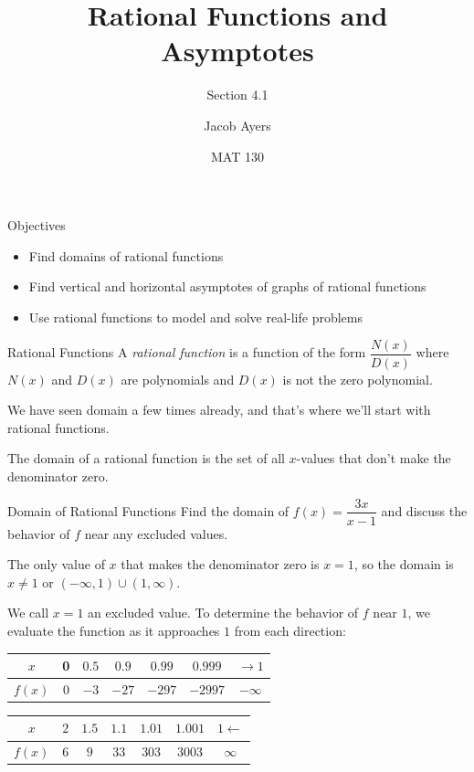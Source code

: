 \documentclass[t]{beamer}
\title[4.1]{Rational Functions and Asymptotes}
\subtitle{Section 4.1}
\author{Jacob Ayers}
\institute{Lesson \#15}
\date{MAT 130}
\begin{document}
	
	\begin{frame}
		\titlepage
	\end{frame}
	
	\begin{frame}{Objectives}
		\begin{itemize}
			\item Find domains of rational functions
			\item Find vertical and horizontal asymptotes of graphs of rational functions
			\item Use rational functions to model and solve real-life problems
		\end{itemize}
	\end{frame}

	\begin{frame}{Rational Functions}
		A \textit{rational function} is a function of the form $\dfrac{N(x)}{D(x)}$ where $N(x)$ and $D(x)$ are polynomials and $D(x)$ is not the zero polynomial.
		
		We have seen domain a few times already, and that's where we'll start with rational functions.
		
		\pause The domain of a rational function is the set of all $x$-values that don't make the denominator zero.
	\end{frame}

	\begin{frame}{Domain of Rational Functions}
		Find the domain of $f(x) = \dfrac{3x}{x-1}$ and discuss the behavior of $f$ near any excluded values. \pause
		
		The only value of $x$ that makes the denominator zero is $x = 1$, so the domain is $x \neq 1$ or $(-\infty, 1) \cup (1, \infty)$. \pause
		
		We call $x = 1$ an excluded value. To determine the behavior of $f$ near $1$, we evaluate the function as it approaches $1$ from each direction: \pause
		
		\begin{tabular}{c|cccccc}
			$x$ & 0 & $0.5$ & $0.9$ & $0.99$ & $0.999$ & $\to 1$ \\ \hline
			$f(x)$ & $0$ & $-3$ & $-27$ & $-297$ & $-2997$ & $-\infty$
		\end{tabular} \pause
	
		\begin{tabular}{c|cccccc}
			$x$ & $2$ & $1.5$ & $1.1$ & $1.01$ & $1.001$ & $1 \leftarrow$ \\ \hline
			$f(x)$ & $6$ & $9$ & $33$ & $303$ & $3003$ & $\infty$
		\end{tabular}
	\end{frame}
\end{document}
